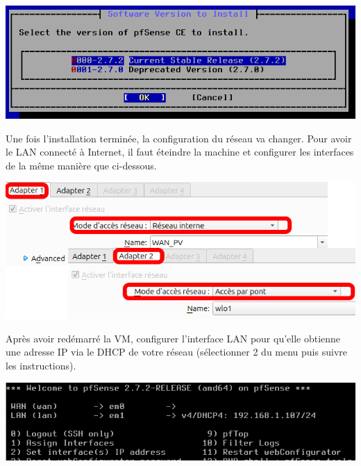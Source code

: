 \documentclass[french, 12pt]{article}%
\begin{document}
\begin{center}
\includegraphics[scale=0.5]{./ressource/VM_network7.png}
\end{center}

Une fois l'installation terminée, la configuration du réseau va changer. Pour avoir le LAN connecté à Internet, il faut éteindre la machine et configurer les interfaces de la même manière que ci-dessous. 

\begin{center}
\includegraphics[scale=0.7]{./ressource/VM_finReseau0}
\end{center}
 
 Après avoir redémarré la VM, configurer l'interface LAN pour qu'elle obtienne une adresse IP via le DHCP de votre réseau (sélectionner 2 du menu puis suivre les instructions).  

\begin{center}
\includegraphics[scale=0.7]{./ressource/VM_finReseau1}
\end{center}
\end{document}
